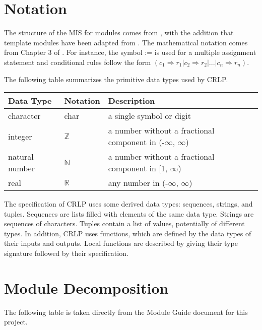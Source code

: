 \documentclass[12pt, titlepage]{article}
\begin{document}
\section{Notation}

The structure of the MIS for modules comes from \citet{HoffmanAndStrooper1995}, with the addition that template modules have been adapted from \cite{GhezziEtAl2003}. The mathematical notation comes from Chapter 3 of \citet{HoffmanAndStrooper1995}. For instance, the symbol := is used for a multiple assignment statement and conditional rules follow the form $(c_1 \Rightarrow r_1 | c_2 \Rightarrow r_2 | ... | c_n \Rightarrow r_n )$.

The following table summarizes the primitive data types used by CRLP.

\begin{center}
\renewcommand{\arraystretch}{1.2}
\noindent 
\begin{tabular}{l l p{7.5cm}} 
\toprule 
\textbf{Data Type} & \textbf{Notation} & \textbf{Description}\\ 
\midrule
character & char & a single symbol or digit\\
integer & $\mathbb{Z}$ & a number without a fractional component in (-$\infty$, $\infty$) \\
natural number & $\mathbb{N}$ & a number without a fractional component in [1, $\infty$) \\
real & $\mathbb{R}$ & any number in (-$\infty$, $\infty$)\\
\bottomrule
\end{tabular} 
\end{center}

\noindent
The specification of CRLP uses some derived data types: sequences, strings, and tuples. Sequences are lists filled with elements of the same data type. Strings are sequences of characters. Tuples contain a list of values, potentially of
different types. In addition, CRLP uses functions, which
are defined by the data types of their inputs and outputs. Local functions are described by giving their type signature followed by their specification.

\section{Module Decomposition}

The following table is taken directly from the Module Guide document for this project.
\end{document}
